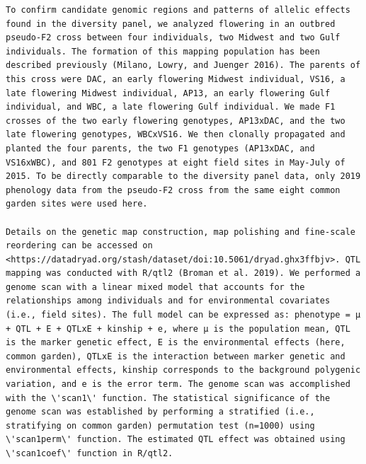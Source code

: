 \documentclass[
  letterpaper,
  DIV=11,
  numbers=noendperiod]{scrartcl}
\begin{document}
\begin{verbatim}
To confirm candidate genomic regions and patterns of allelic effects found in the diversity panel, we analyzed flowering in an outbred pseudo-F2 cross between four individuals, two Midwest and two Gulf individuals. The formation of this mapping population has been described previously (Milano, Lowry, and Juenger 2016). The parents of this cross were DAC, an early flowering Midwest individual, VS16, a late flowering Midwest individual, AP13, an early flowering Gulf individual, and WBC, a late flowering Gulf individual. We made F1 crosses of the two early flowering genotypes, AP13xDAC, and the two late flowering genotypes, WBCxVS16. We then clonally propagated and planted the four parents, the two F1 genotypes (AP13xDAC, and VS16xWBC), and 801 F2 genotypes at eight field sites in May-July of 2015. To be directly comparable to the diversity panel data, only 2019 phenology data from the pseudo-F2 cross from the same eight common garden sites were used here. 

Details on the genetic map construction, map polishing and fine-scale reordering can be accessed on <https://datadryad.org/stash/dataset/doi:10.5061/dryad.ghx3ffbjv>. QTL mapping was conducted with R/qtl2 (Broman et al. 2019). We performed a genome scan with a linear mixed model that accounts for the relationships among individuals and for environmental covariates (i.e., field sites). The full model can be expressed as: phenotype = µ + QTL + E + QTLxE + kinship + e, where µ is the population mean, QTL is the marker genetic effect, E is the environmental effects (here, common garden), QTLxE is the interaction between marker genetic and environmental effects, kinship corresponds to the background polygenic variation, and e is the error term. The genome scan was accomplished with the \'scan1\' function. The statistical significance of the genome scan was established by performing a stratified (i.e., stratifying on common garden) permutation test (n=1000) using \'scan1perm\' function. The estimated QTL effect was obtained using \'scan1coef\' function in R/qtl2. 
\end{verbatim}
\end{document}

